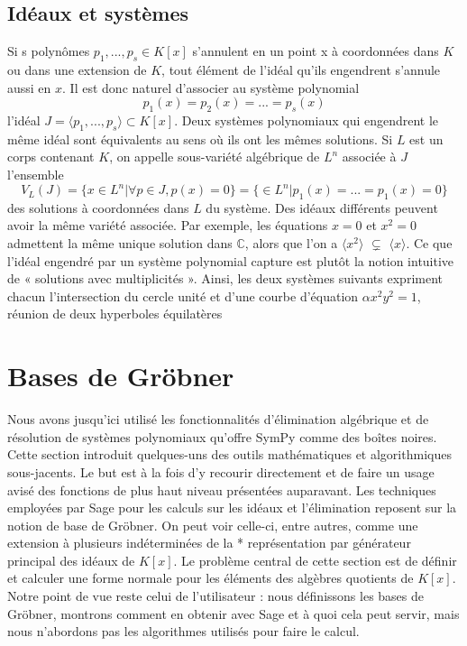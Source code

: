 \subsection{Idéaux et systèmes}
Si s polynômes $p_{1} , . . . , p_{s} \in K\left[x\right]$ s’annulent en un point x à coordonnées
dans $K$ ou dans une extension de $K$, tout élément de l’idéal qu’ils engendrent
s’annule aussi en $x$. Il est donc naturel d’associer au système polynomial
\[
p_{1}\left(x\right)= p_{2}\left(x\right)=...=p_{s}\left(x\right)
\]
l’idéal $J = \langle p_{1}, . . . , p_{s}\rangle \subset K\left[x\right]$. Deux systèmes polynomiaux qui engendrent le même idéal sont équivalents au sens où ils ont les mêmes solutions. Si $L$ est
un corps contenant $K$, on appelle sous-variété algébrique de $L^{n}$ associée à $J$
l’ensemble
\[
V_{L}\left(J\right) = \lbrace x \in L^{n} \vert \forall p \in J, p\left(x\right) = 0 \rbrace =
\lbrace \in L^{n} \vert p_{1}\left(x\right)=...=p_{1}\left(x\right)=0\rbrace
\]
des solutions à coordonnées dans $L$ du système. Des idéaux différents peuvent
avoir la même variété associée. Par exemple, les équations $x = 0$ et $x^{2} = 0$
admettent la même unique solution dans $\mathbb{C}$, alors que l’on a $\langle x^{2}\rangle$ $\subsetneq$ $\langle x\rangle$. Ce que l’idéal engendré par un système polynomial capture est plutôt la notion intuitive
de « solutions avec multiplicités ».
Ainsi, les deux systèmes suivants expriment chacun l’intersection du cercle
unité et d’une courbe d’équation $\alpha x^{2} y^{2} = 1$, réunion de deux hyperboles équilatères 
\section{Bases de Gröbner}
Nous avons jusqu’ici utilisé les fonctionnalités d’élimination algébrique et de résolution de systèmes polynomiaux qu’offre SymPy comme des boîtes noires. Cette section introduit quelques-uns des outils mathématiques et algorithmiques sous-jacents. Le but est à la fois d’y recourir directement et de faire un usage
avisé des fonctions de plus haut niveau présentées auparavant.
Les techniques employées par Sage pour les calculs sur les idéaux et l’élimination reposent sur la notion de 
base de Gröbner. On peut voir celle-ci, entre autres, comme une extension à plusieurs indéterminées de la *
représentation par générateur principal des idéaux de $K\left[x\right]$. Le problème central de cette section 
est de définir et calculer une forme normale pour les éléments des algèbres quotients de $K\left[x\right]$. 
Notre point de vue reste celui de l’utilisateur : nous définissons les bases de Gröbner, montrons comment en 
obtenir avec Sage et à quoi cela peut servir, mais nous n’abordons pas les algorithmes utilisés pour faire le 
calcul.
